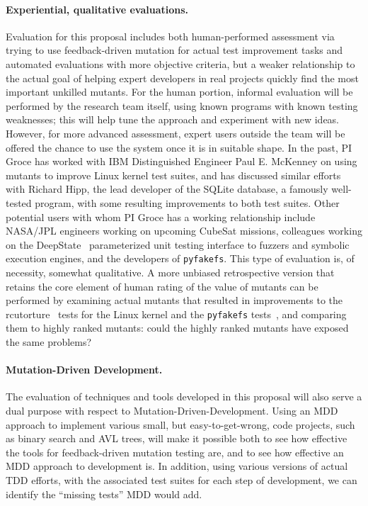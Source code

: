 \paragraph{Experiential, qualitative evaluations.}
Evaluation for this proposal includes both human-performed assessment
via trying to use feedback-driven mutation for actual test improvement
tasks and automated evaluations with more objective criteria, but a
weaker relationship to the actual goal of helping expert developers in
real projects quickly find
the most important unkilled mutants.  For the human portion, informal
evaluation will be performed by the research team itself, using known
programs with known testing weaknesses; this will help tune the
approach and experiment with new ideas.  However, for more advanced
assessment, expert users outside the team will be offered the chance
to use the system once it is in suitable shape.  In the past, PI Groce
has worked with IBM Distinguished Engineer Paul E. McKenney
on using mutants to improve Linux kernel
test suites, and has discussed similar efforts with Richard Hipp, the
lead developer of the SQLite database, a famously well-tested
program, with some resulting improvements to both test suites.  Other
potential users with whom PI Groce has a working relationship include  NASA/JPL engineers working on upcoming CubeSat
missions, colleagues working on the DeepState~\cite{DeepState}
parameterized unit testing interface to fuzzers and symbolic execution
engines, and the developers of {\tt pyfakefs}.  This type of
evaluation is, of necessity, somewhat qualitative.  A more unbiased retrospective
version that retains the core element of human rating of the value of mutants can be performed by examining actual mutants that resulted in
improvements to the rcutorture~\cite{rcutorture} tests for the Linux
kernel and the {\tt pyfakefs} tests~\cite{groce2018verified}, and
comparing them to
highly ranked mutants:  could the highly ranked mutants have exposed
the same problems?


\paragraph{Mutation-Driven Development.}
The evaluation of techniques and tools developed in this proposal will
also serve a dual purpose with respect to
Mutation-Driven-Development.  Using an MDD approach to implement
various small, but easy-to-get-wrong, code projects, such as binary
search and AVL trees, will make it possible both to see how effective
the tools for feedback-driven mutation testing are, and to see how effective an MDD approach to development is.  In
addition, using various versions of actual TDD efforts, with the
associated test suites for each step of development, we can identify
the ``missing tests'' MDD would add.